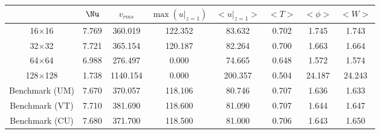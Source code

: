 \begin{tabular}{c|ccccccc}
    & $\Nu$ & $v_{rms}$ & $\max(u|_{z=1})$ & $<u|_{z=1}>$ & $<T>$ & $<\phi>$ & $<W>$ \\
\hline
16$\times$16 & 7.769 & 360.019 & 122.352 & 83.632 & 0.702 & 1.745 & 1.743 \\
32$\times$32 & 7.721 & 365.154 & 120.187 & 82.264 & 0.700 & 1.663 & 1.664 \\
64$\times$64 & 6.988 & 276.497 & 0.000 & 74.665 & 0.648 & 1.572 & 1.574 \\
128$\times$128 & 1.738 & 1140.154 & 0.000 & 200.357 & 0.504 & 24.187 & 24.243 \\
Benchmark (UM) & 7.670 & 370.057 & 118.106 & 80.746 & 0.707 & 1.636 & 1.633 \\
Benchmark (VT) & 7.710 & 381.690 & 118.600 & 81.090 & 0.707 & 1.644 & 1.647 \\
Benchmark (CU) & 7.680 & 371.700 & 118.500 & 81.000 & 0.706 & 1.643 & 1.650 \\
\end{tabular}
